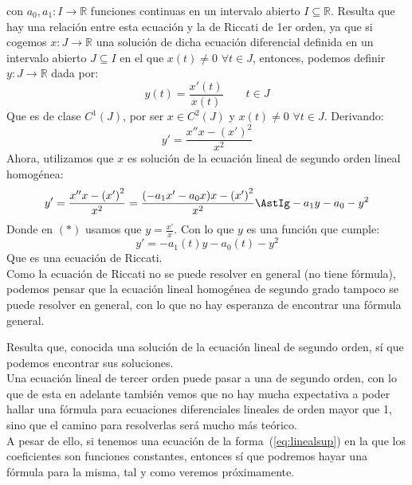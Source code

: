 con $a_0,a_1:I\rightarrow\mathbb{R}$ funciones continuas en un intervalo abierto $I\subseteq \mathbb{R}$. Resulta que hay una relación entre esta ecuación y la de Riccati de 1er orden, ya que si cogemos $x:J\rightarrow\mathbb{R}$ una solución de dicha ecuación diferencial definida en un intervalo abierto $J\subseteq I$ en el que $x(t) \neq 0$ $\forall t\in J$, entonces, podemos definir $y:J\rightarrow\mathbb{R}$ dada por:
\begin{equation*}
    y(t) = \dfrac{x'(t)}{x(t)} \qquad t\in J
\end{equation*}
Que es de clase $C^1(J)$, por ser $x\in C^2(J)$ y $x(t) \neq 0$ $\forall t\in J$. Derivando:
\begin{equation*}
    y' = \dfrac{x'' x - {(x')}^{2}}{x^2}
\end{equation*}
Ahora, utilizamos que $x$ es solución de la ecuación lineal de segundo orden lineal homogénea:
\begin{equation*}
    y' = \dfrac{x'' x - {(x')}^{2}}{x^2} = \dfrac{(-a_1x' - a_0 x)x - {(x')}^{2}}{x^2} \AstIg -a_1 y - a_0 -y^2
\end{equation*}
Donde en $(\ast)$ usamos que $y = \frac{x'}{x}$. Con lo que $y$ es una función que cumple:
\begin{equation*}
    y' = -a_1(t)y - a_0(t) - y^2
\end{equation*}
Que es una ecuación de Riccati.\\

Como la ecuación de Riccati no se puede resolver en general (no tiene fórmula), podemos pensar que la ecuación lineal homogénea de segundo grado tampoco se puede resolver en general, con lo que no hay esperanza de encontrar una fórmula general.

Resulta que, conocida una solución de la ecuación lineal de segundo orden, sí que podemos encontrar sus soluciones.\\

Una ecuación lineal de tercer orden puede pasar a una de segundo orden, con lo que de esta en adelante también vemos que no hay mucha expectativa a poder hallar una fórmula para ecuaciones diferenciales lineales de orden mayor que 1, sino que el camino para resolverlas será mucho más teórico.\\

A pesar de ello, si tenemos una ecuación de la forma~(\ref{eq:linealsup}) en la que los coeficientes son funciones constantes, entonces sí que podremos hayar una fórmula para la misma, tal y como veremos próximamente.

